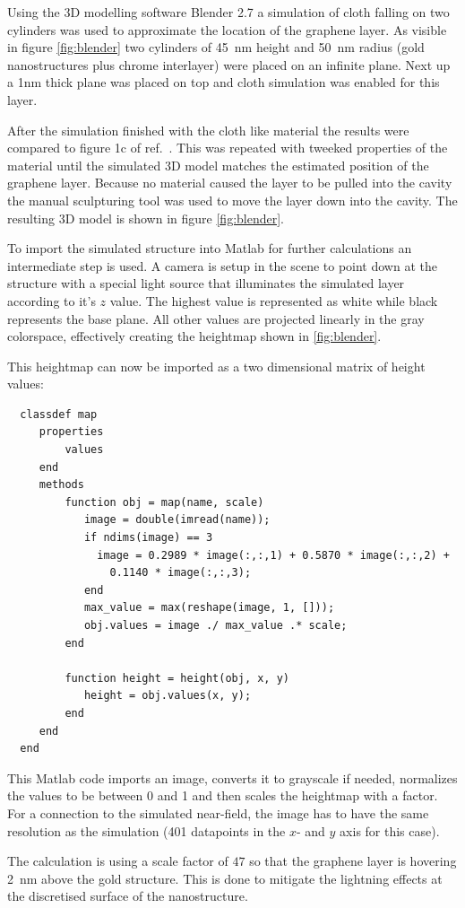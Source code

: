 Using the 3D modelling software Blender 2.7 a simulation of cloth falling on two cylinders was used to approximate the location of the graphene layer. As visible in figure \ref{fig:blender} two cylinders of \SI{45}{nm} height and \SI{50}{nm} radius (gold nanostructures plus chrome interlayer) were placed on an infinite plane. Next up a 1nm thick plane was placed on top and cloth simulation was enabled for this layer.

After the simulation finished with the cloth like material the results were compared to figure 1c of ref.~\cite{heeg}. This was repeated with tweeked properties of the material until the simulated 3D model matches the estimated position of the graphene layer. Because no material caused the layer to be pulled into the cavity the manual sculpturing tool was used to move the layer down into the cavity. The resulting 3D model is shown in figure \ref{fig:blender}.

To import the simulated structure into Matlab for further calculations an intermediate step is used. A camera is setup in the scene to point down at the structure with a special light source that illuminates the simulated layer according to it's $z$ value. The highest value is represented as white while black represents the base plane. All other values are projected linearly in the gray colorspace, effectively creating the heightmap shown in \ref{fig:blender}.

This heightmap can now be imported as a two dimensional matrix of height values:
\begin{verbatim}
  classdef map
     properties
         values
     end
     methods
         function obj = map(name, scale)
            image = double(imread(name));
            if ndims(image) == 3
              image = 0.2989 * image(:,:,1) + 0.5870 * image(:,:,2) +
                0.1140 * image(:,:,3);
            end
            max_value = max(reshape(image, 1, []));
            obj.values = image ./ max_value .* scale;
         end

         function height = height(obj, x, y)
            height = obj.values(x, y);
         end
     end
  end
\end{verbatim}

This Matlab code imports an image, converts it to grayscale if needed, normalizes the values to be between 0 and 1 and then scales the heightmap with a factor. For a connection to the simulated near-field, the image has to have the same resolution as the simulation (401 datapoints in the $x$- and $y$ axis for this case).

The calculation is using a scale factor of $47$ so that the graphene layer is hovering \SI{2}{nm} above the gold structure. This is done to mitigate the lightning effects at the discretised surface of the nanostructure.
